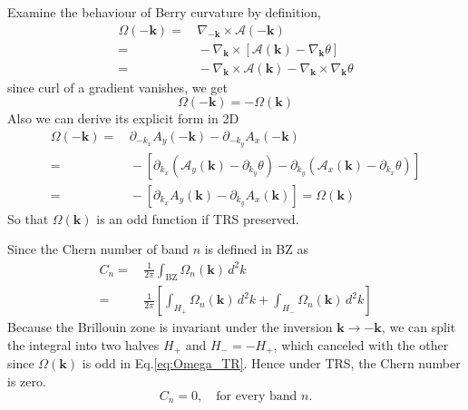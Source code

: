 \documentclass[12pt,a4paper]{article}
\begin{document}
    Examine the behaviour of Berry curvature by definition,
    \[\begin{aligned}
        \Omega(\mathbf{-k})
        = &\, \nabla_\mathbf{-k} \times \mathcal{A}(\mathbf{-k}) \\
        = &\, -\nabla_\mathbf{k} \times \left[\mathcal{A}(\mathbf{k})
        - \nabla_\mathbf{k}\theta\right] \\
        = &\, - \nabla_\mathbf{k} \times \mathcal{A}(\mathbf{k})
        - \nabla_\mathbf{k} \times \nabla_\mathbf{k} \theta
    \end{aligned}\]
    since curl of a gradient vanishes, we get
    \begin{equation}
    \label{eq:Omega_TR}
        \Omega(-\mathbf{k}) = - \Omega(\mathbf{k})
    \end{equation}
    Also we can derive its explicit form in 2D
    \[\begin{aligned}
        \Omega(-\mathbf{k})
        = &\, \partial_{-k_x} A_y(-\mathbf{k})
        - \partial_{-k_y} A_x(-\mathbf{k}) \\
        = &\, -\left[ \partial_{k_x} (\mathcal{A}_y(\mathbf{k}) - \partial_{k_y}\theta)
        - \partial_{k_y} (\mathcal{A}_x(\mathbf{k}) - \partial_{k_x}\theta) \right] \\
        = &\, -\left[ \partial_{k_x} A_y(\mathbf{k})
        - \partial_{k_y} A_x(\mathbf{k}) \right]
        = \Omega(\mathbf{k})
    \end{aligned}\]
    So that $\Omega(\mathbf{k})$ is an odd function if TRS preserved.

    Since the Chern number of band \(n\) is defined in BZ as
    \[\begin{aligned}
        C_n
        = &\, \frac{1}{2\pi} \int_{\mathrm{BZ}} \Omega_n(\mathbf{k}) \, d^2k \\
        = &\, \frac{1}{2\pi} \left[
            \int_{H_+} \Omega_n(\mathbf{k}) \, d^2k
            +\int_{H_-} \Omega_n(\mathbf{k}) \, d^2k
        \right]
    \end{aligned}\]
    Because the Brillouin zone is invariant under the inversion \(\mathbf{k}\to -\mathbf{k}\), we can split the integral into two halves \(H_+\) and \(H_- = -H_+\), which canceled with the other since $\Omega(\mathbf{k})$ is odd in Eq.\eqref{eq:Omega_TR}. Hence under TRS, the Chern number is zero.
    \begin{equation}
    \label{eq:C_TRS}
        C_n = 0, \quad \text{for every band } n.
    \end{equation}
\end{document}

